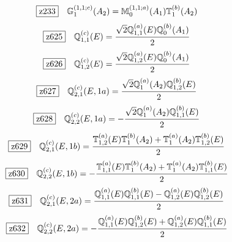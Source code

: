 \documentclass[fleqn,10pt,landscape]{jsarticle}
\begin{document}
\begin{dmath*}
\hspace*{3mm}\fbox{z233}\quad \mathbb{G}_{1}^{(1,1;c)}(A_{2})=\mathbb{M}_{0}^{(1,1;a)}(A_{1}) \mathbb{T}_{1}^{(b)}(A_{2})
\end{dmath*}
\begin{dmath*}
\hspace*{3mm}\fbox{z625}\quad \mathbb{Q}_{1,1}^{(c)}(E)=\frac{\sqrt{2} \mathbb{Q}_{1,1}^{(a)}(E) \mathbb{Q}_{0}^{(b)}(A_{1})}{2}
\end{dmath*}
\begin{dmath*}
\hspace*{3mm}\fbox{z626}\quad \mathbb{Q}_{1,2}^{(c)}(E)=\frac{\sqrt{2} \mathbb{Q}_{1,2}^{(a)}(E) \mathbb{Q}_{0}^{(b)}(A_{1})}{2}
\end{dmath*}
\begin{dmath*}
\hspace*{3mm}\fbox{z627}\quad \mathbb{Q}_{2,1}^{(c)}(E,1a)=\frac{\sqrt{2} \mathbb{Q}_{1}^{(a)}(A_{2}) \mathbb{Q}_{1,2}^{(b)}(E)}{2}
\end{dmath*}
\begin{dmath*}
\hspace*{3mm}\fbox{z628}\quad \mathbb{Q}_{2,2}^{(c)}(E,1a)=- \frac{\sqrt{2} \mathbb{Q}_{1}^{(a)}(A_{2}) \mathbb{Q}_{1,1}^{(b)}(E)}{2}
\end{dmath*}
\begin{dmath*}
\hspace*{3mm}\fbox{z629}\quad \mathbb{Q}_{2,1}^{(c)}(E,1b)=\frac{\mathbb{T}_{1,2}^{(a)}(E) \mathbb{T}_{1}^{(b)}(A_{2}) + \mathbb{T}_{1}^{(a)}(A_{2}) \mathbb{T}_{1,2}^{(b)}(E)}{2}
\end{dmath*}
\begin{dmath*}
\hspace*{3mm}\fbox{z630}\quad \mathbb{Q}_{2,2}^{(c)}(E,1b)=- \frac{\mathbb{T}_{1,1}^{(a)}(E) \mathbb{T}_{1}^{(b)}(A_{2}) + \mathbb{T}_{1}^{(a)}(A_{2}) \mathbb{T}_{1,1}^{(b)}(E)}{2}
\end{dmath*}
\begin{dmath*}
\hspace*{3mm}\fbox{z631}\quad \mathbb{Q}_{2,1}^{(c)}(E,2a)=\frac{\mathbb{Q}_{1,1}^{(a)}(E) \mathbb{Q}_{1,1}^{(b)}(E) - \mathbb{Q}_{1,2}^{(a)}(E) \mathbb{Q}_{1,2}^{(b)}(E)}{2}
\end{dmath*}
\begin{dmath*}
\hspace*{3mm}\fbox{z632}\quad \mathbb{Q}_{2,2}^{(c)}(E,2a)=- \frac{\mathbb{Q}_{1,1}^{(a)}(E) \mathbb{Q}_{1,2}^{(b)}(E) + \mathbb{Q}_{1,2}^{(a)}(E) \mathbb{Q}_{1,1}^{(b)}(E)}{2}
\end{dmath*}
\end{document}
